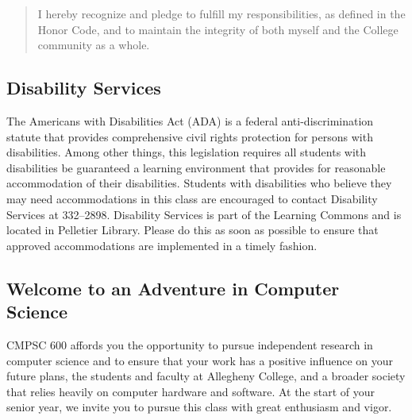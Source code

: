 \documentclass[11pt]{article}
\begin{document}
\begin{quote}
I hereby recognize and pledge to fulfill my responsibilities, as defined in the Honor Code, and to maintain the
integrity of both myself and the College community as a whole.
\end{quote}

\subsection*{Disability Services}

The Americans with Disabilities Act (ADA) is a federal anti-discrimination statute that provides comprehensive civil
rights protection for persons with disabilities.  Among other things, this legislation requires all students with
disabilities be guaranteed a learning environment that provides for reasonable accommodation of their disabilities.
Students with disabilities who believe they may need accommodations in this class are encouraged to contact Disability
Services at 332--2898.  Disability Services is part of the Learning Commons and is located in Pelletier Library.
Please do this as soon as possible to ensure that approved accommodations are implemented in a timely fashion.

\subsection*{Welcome to an Adventure in Computer Science}

CMPSC 600 affords you the opportunity to pursue independent research in computer science and to ensure that your work
has a positive influence on your future plans, the students and faculty at Allegheny College, and a broader society that
relies heavily on computer hardware and software.  At the start of your senior year, we invite you to pursue this class
with great enthusiasm and vigor.
\end{document}
